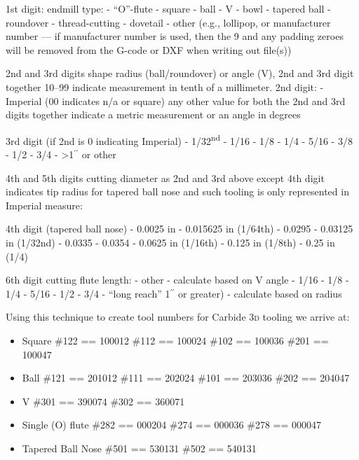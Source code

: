\documentclass{ltxdoc}
\begin{document}
\begin{outline}
\1 1st digit: endmill type:
 - ``O''-flute 
 - square
 - ball
 - V
 - bowl
 - tapered ball
 - roundover
 - thread-cutting
 - dovetail
 - other (e.g., lollipop, or manufacturer number --- if manufacturer number is used, then the 9 and any padding zeroes will be removed from the G-code or DXF when writing out file(s))

\1 2nd and 3rd digits shape radius (ball/roundover) or angle (V), 2nd and 3rd digit together 10--99 indicate measurement in tenth of a millimeter. 2nd digit:
 - Imperial (00 indicates n/a or square) 
\2 any other value for both the 2nd and 3rd digits together indicate a metric measurement or an angle in degrees

\1 3rd digit (if 2nd is 0 indicating Imperial)
 - 1/32\textsuperscript{nd}
 - 1/16
 - 1/8
 - 1/4
 - 5/16
 - 3/8
  - 1/2
 - 3/4
 - >1$^{\prime\prime}$ or other

\1 4th and 5th digits cutting diameter as 2nd and 3rd above except 4th digit indicates tip radius for tapered ball nose and such tooling is only represented in Imperial measure:

\1 4th digit (tapered ball nose)
 - 0.0025 in
 - 0.015625 in (1/64th)
 - 0.0295
 - 0.03125 in (1/32nd)
 - 0.0335
 - 0.0354
 - 0.0625 in (1/16th)
 - 0.125 in (1/8th)
 - 0.25 in (1/4)

\1 6th digit cutting flute length:
 - other
 - calculate based on V angle
 - 1/16
 - 1/8
 - 1/4
 - 5/16
 - 1/2
  - 3/4
 - ``long reach'' 1$^{\prime\prime}$ or greater)
 - calculate based on radius

\end{outline}

Using this technique to create tool numbers for Carbide \textsc{3d} tooling we arrive at:

\begin{itemize}
\item Square
\subitem \#122 == 100012
\subitem \#112 == 100024
\subitem \#102 == 100036
\subitem \#201 == 100047

\item Ball
\subitem \#121 == 201012
\subitem \#111 == 202024
\subitem \#101 == 203036
\subitem \#202 == 204047

\item V
\subitem \#301 == 390074
\subitem \#302 == 360071

\item Single (O) flute
\subitem \#282 == 000204
\subitem \#274 == 000036
\subitem \#278 == 000047

\item Tapered Ball Nose
\subitem \#501 == 530131
\subitem \#502 == 540131
\end{itemize}
\end{document}
